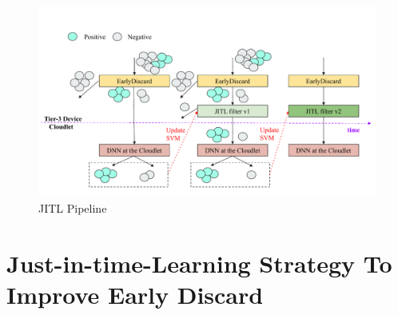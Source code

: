 
\begin{figure}
    \centering
        \includegraphics[width=\linewidth]{FIGS/fig-jitl.pdf}
\caption{JITL Pipeline}
\label{fig:jitl}
\end{figure}

\section{Just-in-time-Learning Strategy To Improve Early Discard}
\label{sec:jitl}

